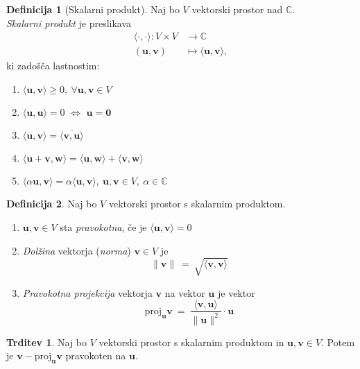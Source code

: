 \documentclass[11pt]{article}
\newcommand{\ls}{\langle}
\newcommand{\rs}{\rangle}
\renewcommand{\u}{\mathbf{u}}
\newcommand{\vv}{\mathbf{v}}
\newcommand{\0}{\mathbf{0}}
\newcommand{\w}{\mathbf{w}}
\theoremstyle{definition}
\newtheorem{definicija}{Definicija}[section]
\theoremstyle{definition}
\newtheorem{trditev}{Trditev}[section]
\theoremstyle{definition}
\theoremstyle{definition}
\begin{document}
\begin{definicija}[Skalarni produkt]

Naj bo $V$ vektorski prostor nad $\mathbb{C}$. \\\textit{Skalarni produkt} je preslikava
\begin{align*}
\ls \cdot, \cdot \rs: V \times V &\rightarrow \mathbb{C} \\
(\u,\vv) &\mapsto \ls \u, \vv \rs,
\end{align*}
ki zadošča lastnostim:
\begin{enumerate}
	\item $\ls \u, \vv \rs \geq 0, ~\forall \u,\vv \in V$ 
	\item $\ls \u, \u \rs = 0$ $\iff$ $\u = \0$
	\item $\ls \u, \vv \rs = \overline{\ls \vv, \u \rs}$
	\item $\ls \u + \vv, \w \rs = \ls \u, \w \rs + \ls \vv, \w \rs$
	\item $\ls \alpha \u, \vv \rs = \alpha \ls \u, \vv \rs, ~\u,\vv\in V, ~\alpha \in \mathbb{C}$
\end{enumerate}

\end{definicija}
\vspace{0.5cm}

\begin{definicija}

Naj bo $V$ vektorski prostor s skalarnim produktom.
\begin{enumerate}
	\item $\u,\vv \in V$ sta \textit{pravokotna}, če je $\ls \u, \vv \rs = 0$
	\item \textit{Dolžina} vektorja (\textit{norma}) $\vv \in V$ je
	$$\|\vv\| ~=~ \sqrt{\ls \vv, \vv \rs}$$
	\item \textit{Pravokotna projekcija} vektorja $\vv$ na vektor $\u$ je vektor 
	$$\text{proj}_\u \vv ~=~ \frac{\ls \vv, \u \rs}{\|\u\|^2} \cdot \u$$
\end{enumerate}

\end{definicija}
\vspace{0.5cm}

\begin{trditev}

Naj bo $V$ vektorski prostor s skalarnim produktom in $\u,\vv \in V$. Potem je $\vv - \text{proj}_\u \vv$ pravokoten na $\u$.

\end{trditev}
\vspace{0.5cm}
\end{document}
